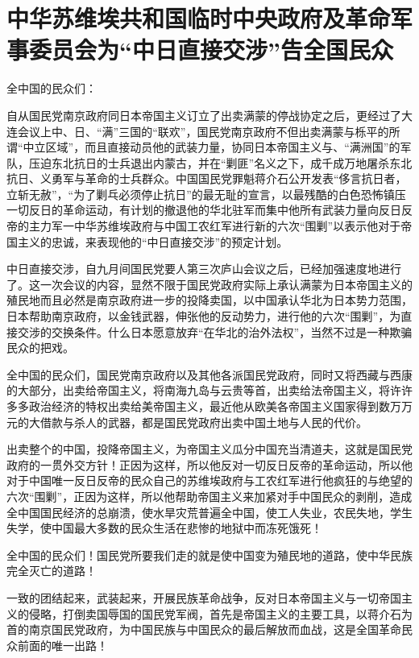 \section[中华苏维埃共和国临时中央政府及革命军事委员会为“中日直接交涉”告全国民众（一九三三年十月十一日）]{中华苏维埃共和国临时中央政府及革命军事委员会为“中日直接交涉”告全国民众}


全中国的民众们：

自从国民党南京政府同日本帝国主义订立了出卖满蒙的停战协定之后，更经过了大连会议上中、日、“满”三国的“联欢”，国民党南京政府不但出卖满蒙与栎平的所谓“中立区域”，而且直接动员他的武装力量，协同日本帝国主义与、“满洲国”的军队，压迫东北抗日的士兵退出内蒙古，并在“剿匪”名义之下，成千成万地屠杀东北抗日、义勇军与革命的士兵群众。中国国民党罪魁蒋介石公开发表“侈言抗日者，立斩无赦”，“为了剿乓必须停止抗日”的最无耻的宣言，以最残酷的白色恐怖镇压一切反日的革命运动，有计划的撤退他的华北驻军而集中他所有武装力量向反日反帝的主力军一中华苏维埃政府与中国工农红军进行新的六次“围剿”以表示他对于帝国主义的忠诚，来表现他的“中日直接交涉”的预定计划。

中日直接交涉，自九月间国民党要人第三次庐山会议之后，已经加强速度地进行了。这一次会议的内容，显然不限于国民党政府实际上承认满蒙为日本帝国主义的殖民地而且必然是南京政府进一步的投降卖国，以中国承认华北为日本势力范围，日本帮助南京政府，以金钱武器，伸张他的反动势力，进行他的六次“围剿”，为直接交涉的交换条件。什么日本愿意放弃“在华北的治外法权”，当然不过是一种欺骗民众的把戏。

全中国的民众们，国民党南京政府以及其他各派国民党政府，同时又将西藏与西康的大部分，出卖给帝国主义，将南海九岛与云贵等首，出卖给法帝国主义，将许许多多政治经济的特权出卖给美帝国主义，最近他从欧美各帝国主义国家得到数万万元的大借款与杀人的武器，都是国民党政府出卖中国土地与人民的代价。

出卖整个的中国，投降帝国主义，为帝国主义瓜分中国充当清道夫，这就是国民党政府的一贯外交方针！正因为这样，所以他反对一切反日反帝的革命运动，所以他对于中国唯一反日反帝的民众自己的苏维埃政府与工农红军进行他疯狂的与绝望的六次“围剿”，正因为这样，所以他帮助帝国主义来加紧对手中国民众的剥削，造成全中国国民经济的总崩溃，使水旱灾荒普遍全中国，使工人失业，农民失地，学生失学，使中国最大多数的民众生活在悲惨的地狱中而冻死饿死！

全中国的民众们！国民党所要我们走的就是使中国变为殖民地的道路，使中华民族完全灭亡的道路！

一致的团结起来，武装起来，开展民族革命战争，反对日本帝国主义与一切帝国主义的侵略，打倒卖国辱国的国民党军阀，首先是帝国主义的主要工具，以蒋介石为首的南京国民党政府，为中国民族与中国民众的最后解放而血战，这是全国革命民众前面的唯一出路！

